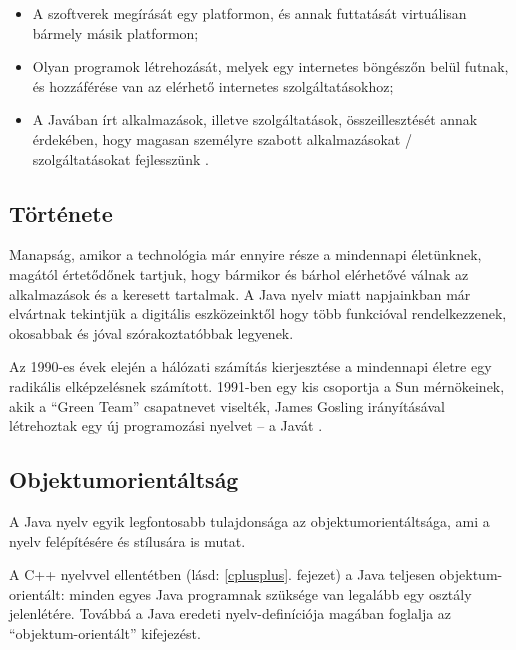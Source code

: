 \documentclass[a4paper,12pt]{report}
\begin{document}
\begin{itemize}
\item A szoftverek megírását egy platformon, és annak futtatását virtuálisan bármely másik platformon;
\item Olyan programok létrehozását, melyek egy internetes böngészőn belül futnak, és hozzáférése van az elérhető internetes szolgáltatásokhoz;
\item A Javában írt alkalmazások, illetve szolgáltatások, összeillesztését annak érdekében, hogy magasan személyre szabott alkalmazásokat / szolgáltatásokat fejlesszünk \cite{aboutjava}.
\end{itemize}




\subsection{Története}
\label{javahistory}

Manapság, amikor a technológia már ennyire része a mindennapi életünknek, magától értetődőnek tartjuk, hogy bármikor és bárhol elérhetővé válnak az alkalmazások és a keresett tartalmak. A Java nyelv miatt napjainkban már elvártnak tekintjük a digitális eszközeinktől hogy több funkcióval rendelkezzenek, okosabbak és jóval szórakoztatóbbak legyenek.

\vspace{2mm}
Az 1990-es évek elején a hálózati számítás kierjesztése a mindennapi életre egy radikális elképzelésnek számított. 1991-ben egy kis csoportja a Sun mérnökeinek, akik a ``Green Team'' csapatnevet viselték, James Gosling irányításával létrehoztak egy új programozási nyelvet -- a Javát \cite{javahistory}.

\subsection{Objektumorientáltság}
\label{oo}

A Java nyelv egyik legfontosabb tulajdonsága az objektumorientáltsága, ami a nyelv felépítésére és stílusára is mutat. 

\vspace{2mm}
A C++ nyelvvel ellentétben (lásd: \ref{cplusplus}. fejezet) a Java teljesen objektum-orientált: minden egyes Java programnak szüksége van legalább egy osztály jelenlétére. Továbbá a Java eredeti nyelv-definíciója magában foglalja az ``objektum-orientált'' kifejezést.
\end{document}
